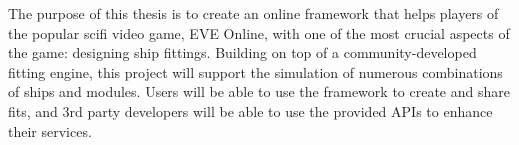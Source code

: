 
The purpose of this thesis is to create an online framework that helps players of the popular scifi video game, EVE Online, with one of the most crucial aspects of the game: designing  ship fittings. Building on top of a community-developed fitting engine, this project will support the simulation of numerous combinations of ships and modules. Users will be able to use the framework to create and share fits, and 3rd party developers will be able to use the provided APIs to enhance their services.
